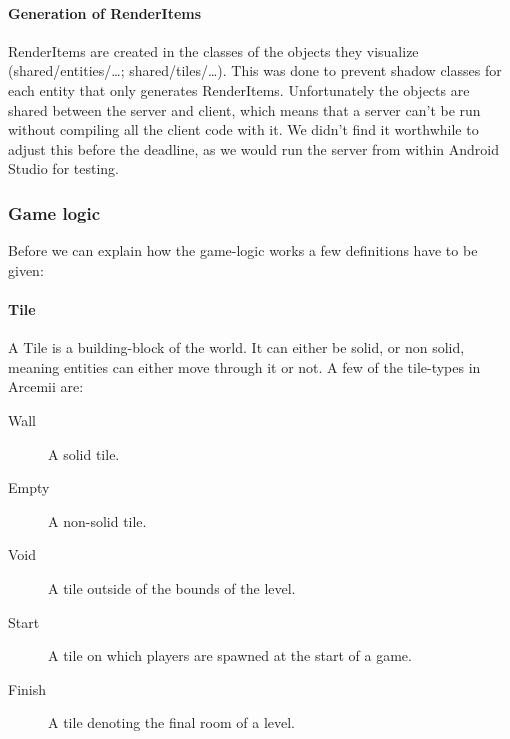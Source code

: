 \documentclass[../main.tex]{subfiles}
\begin{document}
        \paragraph{Generation of RenderItems} RenderItems are created in the classes of the objects they visualize (\tiny shared/entities/\dots; shared/tiles/\dots\normalsize). This was done to prevent shadow classes for each entity that only generates RenderItems. Unfortunately the objects are shared between the server and client, which means that a server can't be run without compiling all the client code with it. We didn't find it worthwhile to adjust this before the deadline, as we would run the server from within Android Studio for testing. 

        
        \subsubsection{Game logic}\label{sec: game logic}
        Before we can explain how the game-logic works a few definitions have to be given:

        \paragraph{Tile} A Tile is a building-block of the world. It can either be solid, or non solid, meaning entities can either move through it or not. A few of the tile-types in Arcemii are:
        \begin{description}
            \item[Wall] A solid tile.
            \item[Empty] A non-solid tile.
            \item[Void] A tile outside of the bounds of the level.
            \item[Start] A tile on which players are spawned at the start of a game.
            \item[Finish] A tile denoting the final room of a level.
        \end{description}
\end{document}
